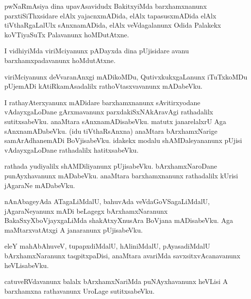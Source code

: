 \documentclass{article}
\begin{document}
\begin{mn}
pwNaRmAsiya  dina  upavAsavidudx  BakitxyiMda  barxhamxnanunx  parxtiSiThxsidare  
elAlx  yajacnxmADida,  elAlx tapasusxmADida elAlx tiVthaRgaLalUlx sAnxnamADida, 
elAlx  veVdagalanunx  Odida Palakekx  koVTiyaSuTx Palavanunx  hoMDutAtxne. 
\end{mn}

\begin{mn}
I vidhiyiMda viriMciyanunx  pADayxda dina pUjisidare  avanu barxhamxpadavanunx  hoMdutAtxne.
\end{mn}

\begin{mn}
viriMciyanunx  deVvaranAnxgi  mADikoMDu, QutivxkukxgaLanunx  iTuTxkoMDu  
pUjemADi  kAtiRkamAsadalilx  rathoVtasxvavanunx  mADabeVku.
\end{mn}

\begin{mn}
I rathayAterxyanunx  mADidare  barxhamxnanunx  sAvitirxyodane  vAdayxgaLoDane  
gArxmavanunx  parxdakiSxNAkAravAgi  rathadalilx  sutitxsabeVku. anaMtara  
sAnxnamADisabeVku.  matutx  janarelalxrU  Aga  sAnxnamADabeVku. (idu tiVthaRsAnxna) 
anaMtara bArxhamxNarige  samArAdhanemADi  BoVjisabeVku.  idakekx modalu  
shAMDaleyananunx  pUjisi  vAdayxgaLoDane  rathadalilx  hatitxsabeVku.
\end{mn}

\begin{mn}
rathada  yudiyalilx  shAMDiliyanunx  pUjisabeVku.  bArxhamxNaroDane  punAyxhavanunx  
mADabeVku.  anaMtara  barxhamxnanunx  rathadalilx  kUrisi  jAgaraNe mADabeVku.
\end{mn}

\begin{mn}
nAnAbageyAda  ATagaLiMdalU,  bahuvAda  veVdaGoVSagaLiMdalU,  jAgaraNeyanunx 
mADi  beLagegx  bArxhamxNaranunx  BakaSxyXboVjayxgaLiMda  shakAtxyXnusAra  
BoVjana mADisabeVku.  Aga maMtarxvatAtxgi A janaranunx pUjisabeVku.
\end{mn}

\begin{mn}
eleY mahAbAhuveV,  tupapxdiMdalU,  hAliniMdalU,  pAyasadiMdalU  bArxhamxNaranunx  
taqpitxpaDisi,  anaMtara  avariMda  savxsitxvAcanavanunx heVLisabeVku.
\end{mn}

\begin{mn}
catuveRVdavanunx  balalx  bArxhamxNariMda  puNAyxhavanunx  heVLisi  
A barxhamxna  rathavanunx  UroLage sutitxsabeVku.
\end{mn}
\end{document}
